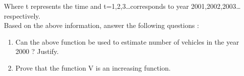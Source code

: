  Where t represents the time and t=1,2,3\dots corresponds to year 2001,2002,2003\dots respectively.\\
 Based on the above information, answer the following questions :
 \begin{enumerate}[label=(\roman*)]
     \item Can the above function be used to estimate number of vehicles in the year 2000 ? Justify. 
     \item Prove that the function V is an increasing function.
 \end{enumerate}
 
 
   
  
